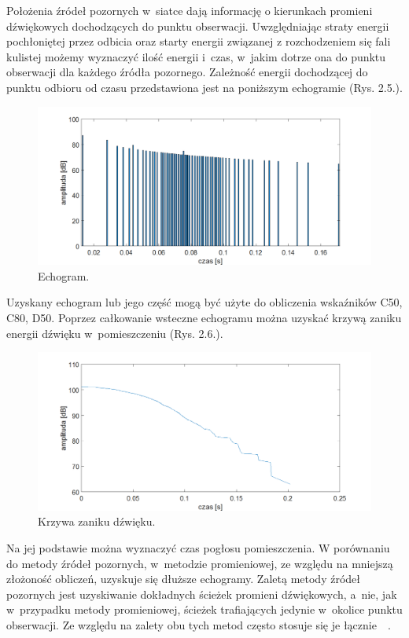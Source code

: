 Położenia  źródeł pozornych w~siatce dają informację o kierunkach promieni dźwiękowych dochodzących do punktu obserwacji. Uwzględniając straty energii pochłoniętej przez odbicia oraz starty energii związanej z rozchodzeniem się fali kulistej możemy wyznaczyć  ilość energii i~czas, w~jakim dotrze ona do punktu obserwacji dla każdego źródła pozornego. Zależność energii dochodzącej do punktu odbioru od czasu przedstawiona jest na poniższym echogramie (Rys. 2.5.).

\begin{figure}[h]
        \centering
                \centering
                \includegraphics[width=16cm]{rys5}
	\caption{Echogram.}
\end{figure}

Uzyskany echogram lub jego część mogą być użyte do obliczenia wskaźników C50, C80, D50. Poprzez całkowanie wsteczne echogramu można uzyskać krzywą zaniku energii dźwięku w~pomieszczeniu (Rys. 2.6.).

\begin{figure}[h]
        \centering
                \centering
                \includegraphics[width=16cm]{rys6}
	\caption{Krzywa zaniku dźwięku.}
\end{figure}

Na jej podstawie można wyznaczyć czas pogłosu pomieszczenia. W porównaniu do metody źródeł pozornych, w~metodzie promieniowej, ze względu na mniejszą złożoność obliczeń, uzyskuje się dłuższe echogramy. Zaletą metody źródeł pozornych jest uzyskiwanie dokładnych ścieżek promieni dźwiękowych, a~nie, jak w~przypadku metody promieniowej, ścieżek trafiających jedynie w~okolice punktu obserwacji. Ze względu na zalety obu tych metod często stosuje się je łącznie~\cite{b13}~\cite{b14}.
















